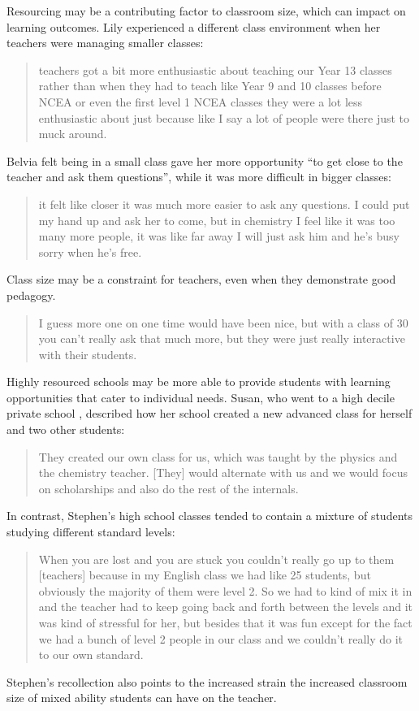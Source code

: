 Resourcing may be a contributing factor to classroom size, which can impact on learning outcomes. Lily experienced a different class environment when her teachers were managing smaller classes: \blockquote{teachers got a bit more enthusiastic about teaching our Year 13 classes rather than when they had to teach like Year 9 and 10 classes before NCEA or even the first level 1 NCEA classes they were a lot less enthusiastic about just because like I say a lot of people were there just to muck around.}. Belvia felt being in a small class gave her more opportunity ``to get close to the teacher and ask them questions'', while it was more difficult in bigger classes: \blockquote{it felt like closer it was much more easier to ask any questions. I could put my hand up and ask her to come, but in chemistry I feel like it was too many more people, it was like far away I will just ask him and he's busy sorry when he's free.} Class size may be a constraint for teachers, even when they demonstrate good pedagogy. \blockquote{I guess more one on one time would have been nice, but with a class of 30 you can’t really ask that much more, but they were just really interactive with their students.} Highly resourced schools may be more able to provide students with learning opportunities that cater to individual needs. Susan, who went to a high decile private school , described how her school created a new advanced class for herself and two other students: \blockquote{They created our own class for us, which was taught by the physics and the chemistry teacher. [They] would alternate with us and we would focus on scholarships and also do the rest of the internals.
} In contrast, Stephen's high school classes tended to contain a mixture of students studying different standard levels: \blockquote{When you are lost and you are stuck you couldn't really go up to them [teachers] because in my English class we had like 25 students, but obviously the majority of them were level 2. So we had to kind of mix it in and the teacher had to keep going back and forth between the levels and it was kind of stressful for her, but besides that it was fun except for the fact we had a bunch of level 2 people in our class and we couldn't really do it to our own standard.
} Stephen's recollection also points to the increased strain the increased classroom size of mixed ability students can have on the teacher. 

